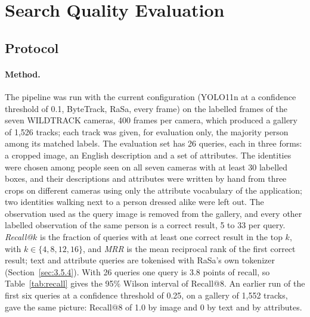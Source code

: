 \section{Search Quality Evaluation}
\label{sec:8.4}

\subsection{Protocol}

\paragraph{Method.} The pipeline was run with the current configuration (YOLO11n at a confidence threshold of 0.1, ByteTrack, RaSa, every frame) on the labelled frames of the seven WILDTRACK cameras, 400 frames per camera, which produced a gallery of 1,526 tracks; each track was given, for evaluation only, the majority person among its matched labels. The evaluation set has 26 queries, each in three forms: a cropped image, an English description and a set of attributes. The identities were chosen among people seen on all seven cameras with at least 30 labelled boxes, and their descriptions and attributes were written by hand from three crops on different cameras using only the attribute vocabulary of the application; two identities walking next to a person dressed alike were left out. The observation used as the query image is removed from the gallery, and every other labelled observation of the same person is a correct result, 5 to 33 per query. \emph{Recall@$k$} is the fraction of queries with at least one correct result in the top $k$, with $k \in \{4, 8, 12, 16\}$, and \emph{MRR} is the mean reciprocal rank of the first correct result; text and attribute queries are tokenised with RaSa's own tokenizer (Section~\ref{sec:3.5.4}). With 26 queries one query is 3.8 points of recall, so Table~\ref{tab:recall} gives the 95\% Wilson interval of Recall@8. An earlier run of the first six queries at a confidence threshold of 0.25, on a gallery of 1,552 tracks, gave the same picture: Recall@8 of 1.0 by image and 0 by text and by attributes.

